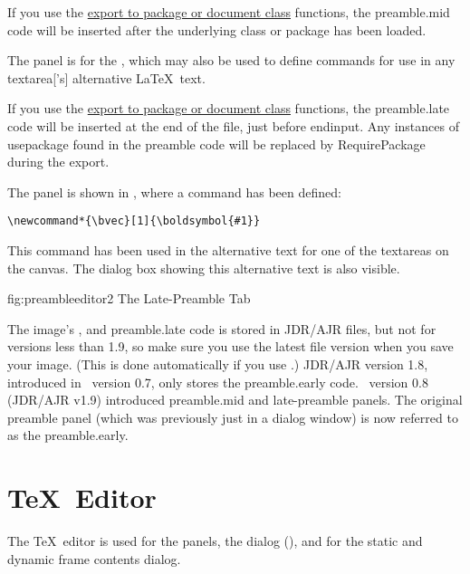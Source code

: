If you use the \hyperref[sec:exportsty]{export to package or document
class} functions, the \gls{preamble.mid} code will be inserted after
the underlying class or package has been loaded.


The  panel is for the
, which may also be used to define
commands for use in any \gls{textarea}['s] alternative \LaTeX\ text.

If you use the \hyperref[sec:exportsty]{export to package or document
class} functions, the \gls{preamble.late} code will be inserted 
at the end of the file, just before
\gls{endinput}. Any instances of \gls{usepackage} found in
the preamble code will be replaced by \gls{RequirePackage}
during the export.

The  panel is shown in ,
where a command has been defined:
\begin{verbatim}
\newcommand*{\bvec}[1]{\boldsymbol{#1}}
\end{verbatim}
This command has been used in the alternative text for one of the
\glspl{textarea} on the \gls{canvas}. The dialog box showing this
alternative text is also visible.

\FloatFig
  {fig:preambleeditor2}
  {}
  {The Late-Preamble Tab}

The image's ,  and
\gls{preamble.late} code is stored in \gls{JDR}\slash \gls{AJR}
files, but not for versions less than 1.9, so make sure you use the
latest file version when you save your image. (This is done
automatically if you use .) \gls{JDR}\slash\gls{AJR}
version 1.8, introduced in \FlowframTk\ version 0.7, only stores the
\gls{preamble.early} code.  \FlowframTk\ version 0.8
(\gls{JDR}\slash\gls{AJR} v1.9) introduced \gls{preamble.mid} and
late-preamble panels. The original preamble panel (which was
previously just in a dialog window) is now referred to as the
\gls{preamble.early}.

\section{\TeX\ Editor}\label{sec:texeditor}

The \TeX\ editor is used for the  panels,
the  dialog (),
and for the static and dynamic frame contents dialog.

